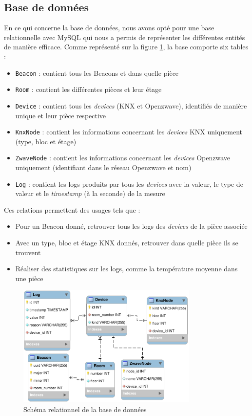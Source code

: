 \subsection{Base de données}
En ce qui concerne la base de données, nous avons opté pour une base relationnelle avec MySQL \cite{mysql} qui nous a permis de représenter les différentes entités de manière efficace. Comme représenté sur la figure \ref{db_schema}, la base comporte six tables :
\begin{itemize}
    \item \texttt{Beacon} : contient tous les Beacons et dans quelle pièce
    \item \texttt{Room} : contient les différentes pièces et leur étage
    \item \texttt{Device} : contient tous les \textit{devices} (KNX et Openzwave), identifiés de manière unique et leur pièce respective
    \item \texttt{KnxNode} : contient les informations concernant les \textit{devices} KNX uniquement (type, bloc et étage)
    \item \texttt{ZwaveNode} : contient les informations concernant les \textit{devices} Openzwave uniquement (identifiant dans le réseau Openzwave et nom)
    \item \texttt{Log} : contient les logs produits par tous les \textit{devices} avec la valeur, le type de valeur et le \textit{timestamp} (à la seconde) de la mesure
\end{itemize}
Ces relations permettent des usages tels que :
\begin{itemize}
    \item Pour un Beacon donné, retrouver tous les logs des \textit{devices} de la pièce associée
    \item Avec un type, bloc et étage KNX donnés, retrouver dans quelle pièce ils se trouvent
    \item Réaliser des statistiques sur les logs, comme la température moyenne dans une pièce
\end{itemize}

\begin{figure}
    \begin{center}
        \includegraphics[width=0.8\textwidth]{img/mysql-shema.png}
    \end{center}
    \caption{Schéma relationnel de la base de données}
    \label{db_schema}
\end{figure}

